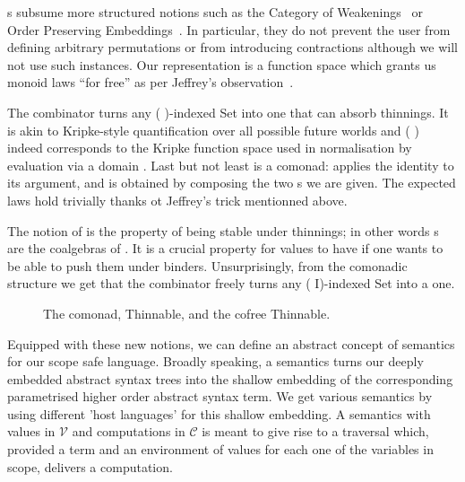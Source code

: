 s subsume more structured notions such as the Category of
Weakenings~\cite{altenkirch1995categorical} or Order Preserving
Embeddings~\cite{chapman2009type}. In particular, they do not prevent the
user from defining arbitrary permutations or from introducing contractions
although we will not use such instances. Our representation is a function
space which grants us monoid laws ``for free'' as per Jeffrey's
observation~\citeyear{jeffrey2011assoc}.

The  combinator turns any ( )-indexed Set into one that can absorb
thinnings. It is akin to Kripke-style quantification over all possible future
worlds and  (  ) indeed corresponds to the Kripke
function space used in normalisation by evaluation via a domain .
Last but not least  is a comonad:  applies the identity 
to its argument, and  is obtained by composing the two s
we are given. The expected laws hold trivially thanks ot Jeffrey's trick mentionned
above.

The notion of  is the property of being stable under thinnings;
in other words s are the coalgebras of .
It is a crucial property for values to have if one wants to be able to push
them under binders. Unsurprisingly, from the comonadic structure we get that
the  combinator freely turns any ( I)-indexed Set into a
 one.

\begin{figure}[h]
\begin{minipage}{0.45\textwidth}
\end{minipage}\hspace{2em}
\begin{minipage}{0.45\textwidth}
\end{minipage}
\caption{The  comonad, Thinnable, and the cofree Thinnable.}
\end{figure}

Equipped with these new notions, we can define an abstract
concept of semantics for our scope safe language. Broadly
speaking, a semantics turns our deeply embedded abstract
syntax trees into the shallow embedding of the corresponding
parametrised higher order abstract syntax term. We get various
semantics by using different 'host languages' for this shallow
embedding. A semantics with values in $\mathcal{V}$ and
computations in $\mathcal{C}$ is meant to give rise to a
traversal which, provided a term and an environment of values
for each one of the variables in scope, delivers a computation.

